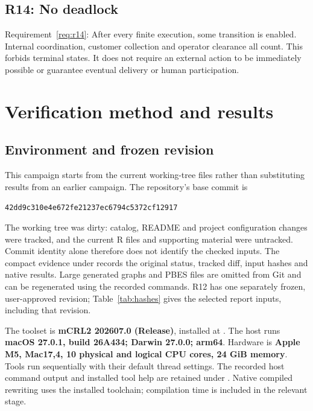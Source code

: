 \documentclass[11pt,a4paper]{article}
\newcommand{\checkedinputs}{../properties}
\begin{document}
\Needspace{190pt}
\subsection{R14: No deadlock}
\label{formula:r14}
Requirement~\ref{req:r14}: After every finite execution, some transition is enabled. Internal coordination, customer collection and operator clearance all count. This forbids terminal states. It does not require an external action to be immediately possible or guarantee eventual delivery or human participation.


\clearpage
\section{Verification method and results}
\label{sec:verification}
\subsection{Environment and frozen revision}
This campaign starts from the current working-tree files rather than substituting results from an earlier campaign. The repository's base commit is
\begin{center}\small\texttt{42dd9c310e4e672fe21237ec6794c5372cf12917}\end{center}
The working tree was dirty: catalog, README and project configuration changes were tracked, and the current R files and supporting material were untracked. Commit identity alone therefore does not identify the checked inputs. The compact evidence under  records the original status, tracked diff, input hashes and native results. Large generated graphs and PBES files are omitted from Git and can be regenerated using the recorded commands. R12 has one separately frozen, user-approved revision; Table~\ref{tab:hashes} gives the selected report inputs, including that revision.

The toolset is \textbf{mCRL2 202607.0 (Release)}, installed at . The host runs \textbf{macOS 27.0.1, build 26A434; Darwin 27.0.0; arm64}. Hardware is \textbf{Apple M5, Mac17,4, 10 physical and logical CPU cores, 24 GiB memory}. Tools run sequentially with their default thread settings. The recorded host command output and installed tool help are retained under . Native compiled rewriting uses the installed toolchain; compilation time is included in the relevant stage.
\end{document}
